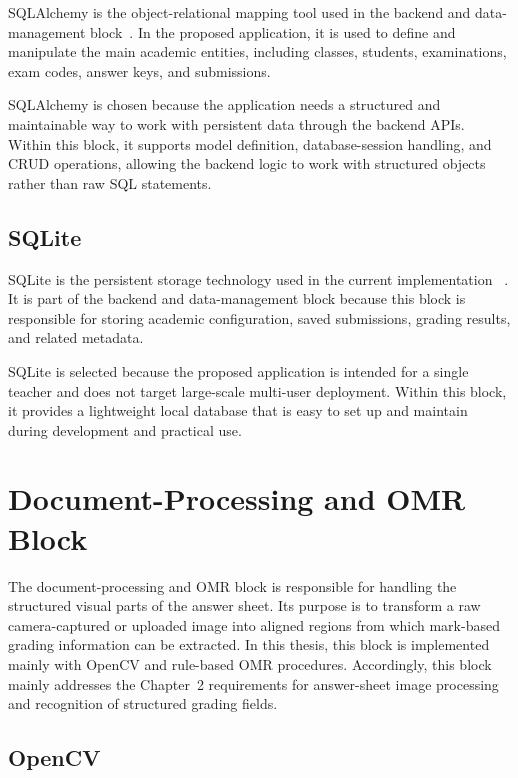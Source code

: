 \documentclass[../Main.tex]{subfiles}
\begin{document}
SQLAlchemy is the object-relational mapping tool used in the backend and
data-management block~\cite{sqlalchemy2026}. In the proposed application, it is
used to define and manipulate the main academic entities, including classes,
students, examinations, exam codes, answer keys, and submissions.

SQLAlchemy is chosen because the application needs a structured and maintainable
way to work with persistent data through the backend APIs. Within this block, it
supports model definition, database-session handling, and CRUD operations,
allowing the backend logic to work with structured objects rather than raw SQL
statements.

\subsection{SQLite}
\label{subsection:3.3.3}

SQLite is the persistent storage technology used in the current implementation
~\cite{sqlite2026}. It is part of the backend and data-management block because
this block is responsible for storing academic configuration, saved
submissions, grading results, and related metadata.

SQLite is selected because the proposed application is intended for a single
teacher and does not target large-scale multi-user deployment. Within this
block, it provides a lightweight local database that is easy to set up and
maintain during development and practical use.

\section{Document-Processing and OMR Block}
\label{section:3.4}

The document-processing and OMR block is responsible for handling the
structured visual parts of the answer sheet. Its purpose is to transform a raw
camera-captured or uploaded image into aligned regions from which mark-based
grading information can be extracted. In this thesis, this block is implemented
mainly with OpenCV and rule-based OMR procedures.
Accordingly, this block mainly addresses the Chapter~2 requirements for answer-sheet image
processing and recognition of structured grading fields.

\subsection{OpenCV}
\label{subsection:3.4.1}
\end{document}
